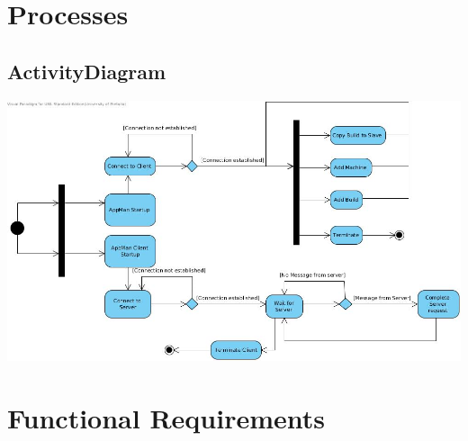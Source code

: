 \documentclass[a4paper,12pt,final]{article}
\begin{document}
\section{Processes}
\subsection{ActivityDiagram}
\begin{center}
\includegraphics[scale=0.37]{ActivityDiagram.jpg} 
\end{center}

\section{Functional Requirements}
\end{document}
